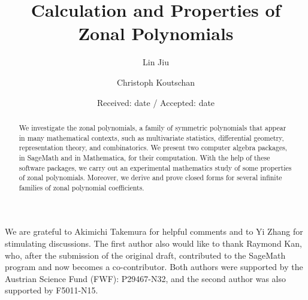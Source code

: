 \documentclass[smallextended]{svjour3}
\begin{document}
\title{Calculation and Properties of Zonal Polynomials}

\author{Lin Jiu \and Christoph Koutschan}




\date{Received: date / Accepted: date}



\maketitle


\begin{abstract}
We investigate the zonal polynomials, a family of symmetric polynomials that
  appear in many mathematical contexts, such as multivariate statistics,
  differential geometry, representation theory, and combinatorics.  We present
  two computer algebra packages, in SageMath and in Mathematica, for their
  computation. With the help of these software packages, we carry out an experimental
  mathematics study of some properties of zonal polynomials. Moreover, we
  derive and prove closed forms for several infinite families of zonal
  polynomial coefficients.
\end{abstract}

\begin{acknowledgements}
We are grateful to Akimichi Takemura for helpful comments and to Yi Zhang for
stimulating discussions.
The first author also would like to thank Raymond Kan, who, after the
submission of the original draft, contributed to the SageMath program and now
becomes a co-contributor.
Both authors were supported by the Austrian Science Fund (FWF): P29467-N32, and the second author was also supported by F5011-N15.
\end{acknowledgements}
\end{document}
